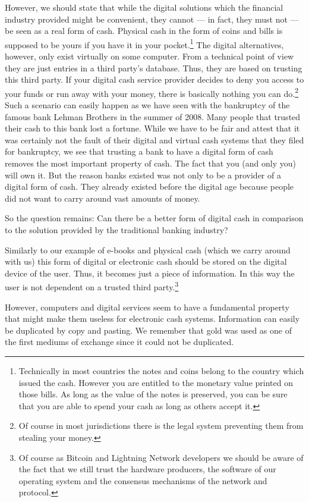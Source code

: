 \documentclass[a4paper,12pt,oneside,openany]{book}
\begin{document}
However, we should state that while the digital solutions which the financial industry provided might be convenient, they cannot --- in fact, they must not --- be seen as a real form of cash.
Physical cash in the form of coins and bills is supposed to be yours if you have it in your pocket.\footnote{Technically in most countries the notes and coins belong to the country which issued the cash. 
However you are entitled to the monetary value printed on those bills. As long as the value of the notes is preserved, you can be sure that you are able to spend your cash as long as others accept it.}
The digital alternatives, however, only exist virtually on some computer.
From a technical point of view they are just entries in a third party's database.
Thus, they are based on trusting this third party.
If your digital cash service provider decides to deny you access to your funds or run away with your money, there is basically nothing you can do.\footnote{Of course in most jurisdictions there is the legal system preventing them from stealing your money.}
Such a scenario can easily happen as we have seen with the bankruptcy of the famous bank Lehman Brothers in the summer of 2008. Many people that trusted their cash to this bank lost a fortune.
While we have to be fair and attest that it was certainly not the fault of their digital and virtual cash systems that they filed for bankruptcy, we see that trusting a bank to have a digital form of cash removes the most important property of cash.
The fact that you (and only you) will own it.
But the reason banks existed was not only to be a provider of a digital form of cash.
They already existed before the digital age because people did not want to carry around vast amounts of money.

So the question remains: Can there be a better form of digital cash in comparison to the solution provided by the traditional banking industry? 

Similarly to our example of e-books and physical cash (which we carry around with us) this form of digital or electronic cash should be stored on the digital device of the user.
Thus, it becomes just a piece of information.
In this way the user is not dependent on a trusted third party.\footnote{Of course as Bitcoin and Lightning Network developers we should be aware of the fact that we still trust the hardware producers, the software of our operating system and the consensus mechanisms of the network and protocol.}

However, computers and digital services seem to have a fundamental property that might make them useless for electronic cash systems.
Information can easily be duplicated by copy and pasting.
We remember that gold was used as one of the first mediums of exchange since it could not be duplicated.
\end{document}
